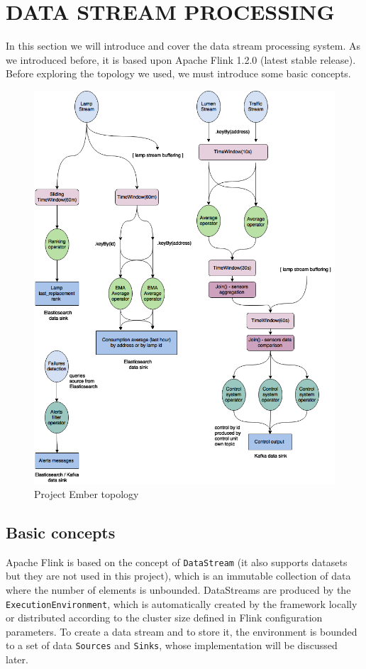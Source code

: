 \section{DATA STREAM PROCESSING}
In this section we will introduce and cover the data stream processing system. As we introduced before, it is based upon Apache Flink 1.2.0 (latest stable release). Before exploring the topology we used, we must introduce some basic concepts.

\begin{figure}
\begin{center}
	\includegraphics[scale=0.3]{img/ember_topology}
	\caption{Project Ember topology}
	\label{fig:ember_topology}
\end{center}
\end{figure}

\subsection{Basic concepts}
Apache Flink is based on the concept of \texttt{DataStream} (it also supports datasets but they are not used in this project), which is an immutable collection of data where the number of elements is unbounded. 
DataStreams are produced by the \texttt{ExecutionEnvironment}, which is automatically created by the framework locally or distributed according to the cluster size defined in Flink configuration parameters. To create a data stream and to store it, the environment is bounded to a set of data \texttt{Sources} and \texttt{Sinks}, whose implementation will be discussed later.

